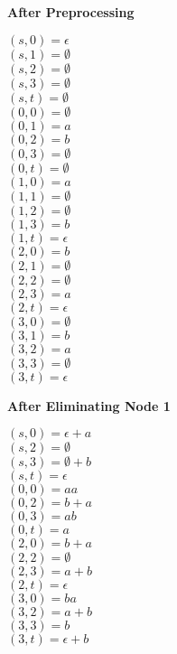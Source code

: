 \documentclass[12pt]{article}
\begin{document}
\noindent\textbf{After Preprocessing}
\begin{multicols}{5}
\noindent
$(s,0) = \epsilon$\\
$(s,1) = \emptyset$\\
$(s,2) = \emptyset$\\
$(s,3) = \emptyset$\\
$(s,t) = \emptyset$\\
\columnbreak
\break
$(0,0) = \emptyset$\\
$(0,1) = a$\\
$(0,2) = b$\\
$(0,3) = \emptyset$\\
$(0,t) = \emptyset$\\
\columnbreak
\break
$(1,0) = a$\\
$(1,1) = \emptyset$\\
$(1,2) = \emptyset$\\
$(1,3) = b$\\
$(1,t) = \epsilon$\\
\columnbreak
\break
$(2,0) = b$\\
$(2,1) = \emptyset$\\
$(2,2) = \emptyset$\\
$(2,3) = a$\\
$(2,t) = \epsilon$\\
\columnbreak
\break
$(3,0) = \emptyset$\\
$(3,1) = b$\\
$(3,2) = a$\\
$(3,3) = \emptyset$\\
$(3,t) = \epsilon$\\
\end{multicols}

\noindent\textbf{After Eliminating Node 1}
\begin{multicols}{4}
\noindent
$(s,0) = \epsilon + a$\\
$(s,2) = \emptyset$\\
$(s,3) = \emptyset + b$\\
$(s,t) = \epsilon$\\
\columnbreak
\break
$(0,0) = aa$\\
$(0,2) = b+a$\\
$(0,3) = ab$\\
$(0,t) = a$\\
\columnbreak
\break
$(2,0) = b+a$\\
$(2,2) = \emptyset$\\
$(2,3) = a+b$\\
$(2,t) = \epsilon$\\
\columnbreak
\break
$(3,0) = ba$\\
$(3,2) = a+b$\\
$(3,3) = b$\\
$(3,t) = \epsilon+b$\\
\end{multicols}
\end{document}
